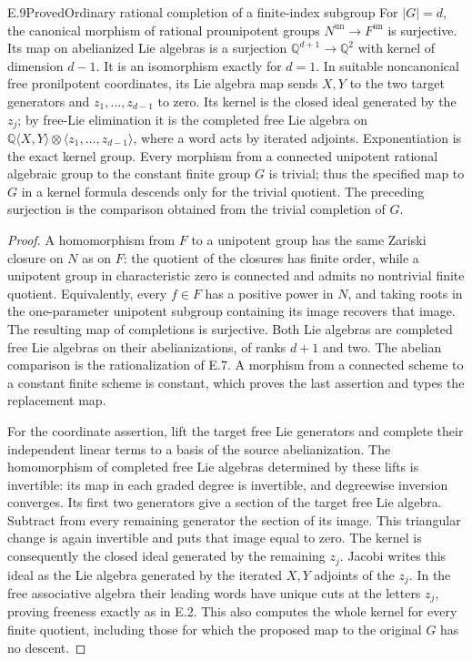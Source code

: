 \begin{statement}{E.9}{Proved}{Ordinary rational completion of a finite-index subgroup}
For $|G|=d$, the canonical morphism of rational prounipotent groups
$N^{\mathrm{un}}\to F^{\mathrm{un}}$ is surjective. Its map on
abelianized Lie algebras is a surjection
$\mathbb Q^{d+1}\to\mathbb Q^2$ with kernel of dimension $d-1$.
It is an isomorphism exactly for $d=1$.
In suitable noncanonical free pronilpotent coordinates, its Lie
algebra map sends $X,Y$ to the two target generators and
$z_1,\ldots,z_{d-1}$ to zero. Its kernel is the closed ideal
generated by the $z_j$; by free-Lie elimination it is the completed
free Lie algebra on
$\mathbb Q\langle X,Y\rangle\otimes
\langle z_1,\ldots,z_{d-1}\rangle$, where a word acts by iterated
adjoints. Exponentiation is the exact kernel group.
Every morphism from a connected unipotent rational algebraic group
to the constant finite group $G$ is trivial; thus the specified
map to $G$ in a kernel formula descends only for the trivial
quotient. The preceding surjection is the comparison obtained
from the trivial completion of $G$.
\end{statement}
\begin{proof}
A homomorphism from $F$ to a unipotent group has the same Zariski
closure on $N$ as on $F$: the quotient of the closures has finite
order, while a unipotent group in characteristic zero is connected
and admits no nontrivial finite quotient. Equivalently, every
$f\in F$ has a positive power in $N$, and taking roots in the
one-parameter unipotent subgroup containing its image recovers
that image. The resulting map of completions is surjective.
Both Lie algebras are completed free Lie algebras on their
abelianizations, of ranks $d+1$ and two. The abelian comparison
is the rationalization of E.7. A morphism from a connected scheme
to a constant finite scheme is constant, which proves the last
assertion and types the replacement map.

For the coordinate assertion, lift the target free Lie generators
and complete their independent linear terms to a basis of the
source abelianization. The homomorphism of completed free Lie
algebras determined by these lifts is invertible: its map in
each graded degree is invertible, and degreewise inversion
converges. Its first two generators give a section of the target
free Lie algebra. Subtract from every remaining generator the
section of its image. This triangular change is again invertible
and puts that image equal to zero. The kernel is consequently
the closed ideal generated by the remaining $z_j$.
Jacobi writes this ideal as the Lie algebra generated by the
iterated $X,Y$ adjoints of the $z_j$. In the free associative
algebra their leading words have unique cuts at the letters
$z_j$, proving freeness exactly as in E.2. This also computes
the whole kernel for every finite quotient, including those for
which the proposed map to the original $G$ has no descent.
\end{proof}

